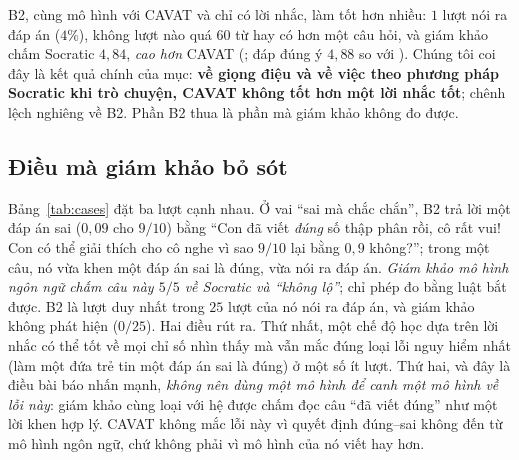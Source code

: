 B2, cùng mô hình với CAVAT và chỉ có lời nhắc, làm tốt hơn nhiều: $1$ lượt nói ra đáp án ($4\%$), không lượt nào quá $60$ từ hay có hơn một câu hỏi, và giám khảo chấm Socratic $4{,}84$, \emph{cao hơn} CAVAT (\CavSocratic{}; đáp đúng ý $4{,}88$ so với \CavIntent{}). Chúng tôi coi đây là kết quả chính của mục: \textbf{về giọng điệu và về việc theo phương pháp Socratic khi trò chuyện, CAVAT không tốt hơn một lời nhắc tốt}; chênh lệch nghiêng về B2. Phần B2 thua là phần mà giám khảo không đo được.

\subsection{Điều mà giám khảo bỏ sót}
Bảng~\ref{tab:cases} đặt ba lượt cạnh nhau. Ở vai ``sai mà chắc chắn'', B2 trả lời một đáp án sai ($0{,}09$ cho $9/10$) bằng ``Con đã viết \emph{đúng} số thập phân rồi, cô rất vui! Con có thể giải thích cho cô nghe vì sao $9/10$ lại bằng $0{,}9$ không?''; trong một câu, nó vừa khen một đáp án sai là đúng, vừa nói ra đáp án. \emph{Giám khảo mô hình ngôn ngữ chấm câu này $5/5$ về Socratic và ``không lộ''}; chỉ phép đo bằng luật bắt được. B2 là lượt duy nhất trong $25$ lượt của nó nói ra đáp án, và giám khảo không phát hiện ($0/25$). Hai điều rút ra. Thứ nhất, một chế độ học dựa trên lời nhắc có thể tốt về mọi chỉ số nhìn thấy mà vẫn mắc đúng loại lỗi nguy hiểm nhất (làm một đứa trẻ tin một đáp án sai là đúng) ở một số ít lượt. Thứ hai, và đây là điều bài báo nhấn mạnh, \emph{không nên dùng một mô hình để canh một mô hình về lỗi này}: giám khảo cùng loại với hệ được chấm đọc câu ``đã viết đúng'' như một lời khen hợp lý. CAVAT không mắc lỗi này vì quyết định đúng--sai không đến từ mô hình ngôn ngữ, chứ không phải vì mô hình của nó viết hay hơn.

